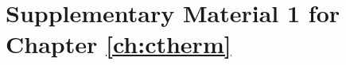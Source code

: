
\renewcommand{\hbAppendixPrefix}{C}

\renewcommand{\thefigure}{\hbAppendixPrefix\arabic{figure}}
\setcounter{figure}{0}
\renewcommand{\thetable}{\hbAppendixPrefix\arabic{table}}
\setcounter{table}{0}
\renewcommand{\theequation}{\hbAppendixPrefix\arabic{equation}}
\setcounter{equation}{0}

\section{Supplementary Material 1 for Chapter \ref{ch:ctherm}} \label{apx:sm1-ctherm}

%




%
%
%


